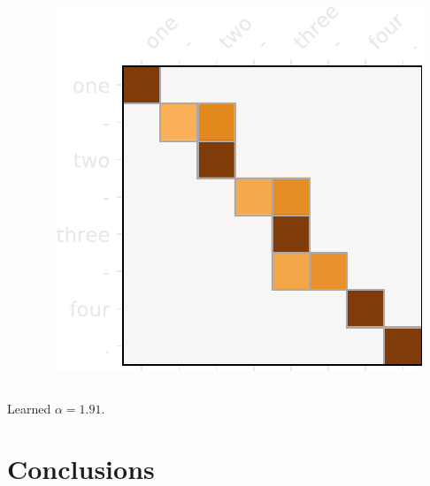 \documentclass[xetex,aspectratio=169,xcolor,professionalfonts,hyperref]{beamer}
\begin{document}
\begin{frame}
\begin{columns}[T]
\begin{column}{.33\textwidth}
        \end{column}
        \begin{column}{.33\textwidth}
        \centering
        \includegraphics[width=0.9\columnwidth]{figures/bpe2}
        \end{column}
        \end{columns}

        \begin{center}
            \fontsize{12pt}{15}\selectfont
            Learned {\color{myDarkYellow}$\alpha = 1.91$}.
        \end{center}

\end{frame}

\section{Conclusions}
\end{document}
